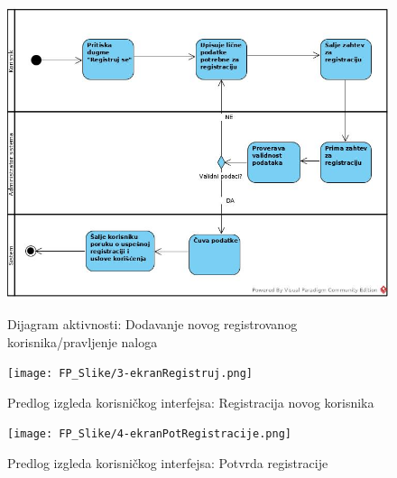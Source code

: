 \documentclass[20pt]{article}
\begin{document}
\begin{figure}[h]
        \centering
        \includegraphics[width=1.1\textwidth,height=0.74\textheight]{Pictures/DodavanjeNovogRegistrovanogKorisnika.jpg}\\
        \caption{Dijagram aktivnosti: Dodavanje novog registrovanog korisnika/pravljenje naloga}
        \label{fig:dijagramAktivnostiDodavanjeKorisnika}
    \end{figure}
\newpage

\begin{figure}[h]
        \centering
        \texttt{[image: FP\_Slike/3-ekranRegistruj.png]}\\
        \caption{Predlog izgleda korisni\v ckog interfejsa: Registracija novog korisnika}
   \end{figure}
\newpage
\begin{figure}[h]
        \centering
        \texttt{[image: FP\_Slike/4-ekranPotRegistracije.png]}\\
        \caption{Predlog izgleda korisni\v ckog interfejsa: Potvrda registracije}
    \end{figure}

\newpage
\end{document}
